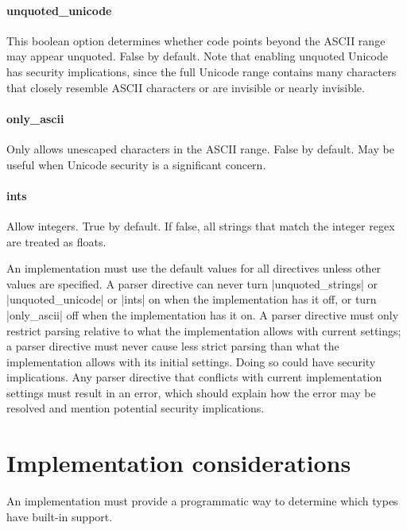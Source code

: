 \documentclass[11pt]{article}
\begin{document}
{{\paragraph{unquoted\_unicode}
This boolean option determines whether code points beyond the ASCII range may appear unquoted.  False by default.  Note that enabling unquoted Unicode has security implications, since the full Unicode range contains many characters that closely resemble ASCII characters or are invisible or nearly invisible.

\paragraph{only\_ascii}  Only allows unescaped characters in the ASCII range.  False by default.  May be useful when Unicode security is a significant concern.

\paragraph{ints}  Allow integers.  True by default.  If false, all strings that match the integer regex are treated as floats.

An implementation must use the default values for all directives unless other values are specified.  A parser directive can never turn |unquoted_strings| or |unquoted_unicode| or |ints| on when the implementation has it off, or turn |only_ascii| off when the implementation has it on.  A parser directive must only restrict parsing relative to what the implementation allows with current settings; a parser directive must never cause less strict parsing than what the implementation allows with its initial settings.  Doing so could have security implications.  Any parser directive that conflicts with current implementation settings must result in an error, which should explain how the error may be resolved and mention potential security implications.



\section{Implementation considerations}

An implementation must provide a programmatic way to determine which types have built-in support.

}}
\end{document}
